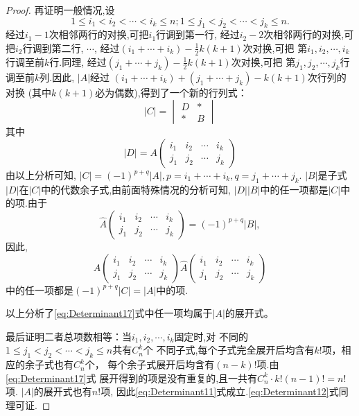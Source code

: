 \begin{proof}
  再证明一般情况,设
  \[ 1 \leq i_1 < i_2 < \cdots < i_k \leq n;1 \leq j_1 < j_2 < \cdots < j_k \leq n.\]
  经过$i_1-1$次相邻两行的对换,可把$i_1$行调到第一行,
  经过$i_2-2$次相邻两行的对换,可把$i_2$行调到第二行, $\cdots$,
  经过$(i_1+\cdots+i_k)-\frac{1}{2}k(k+1)$次对换,可把
  第$i_1,i_2,\cdots,i_k$行调至前$k$行.同理,
  经过$(j_1+\cdots+j_k)-\frac{1}{2}k(k+1)$次对换,可把
  第$j_1,j_2,\cdots,j_k$行调至前$k$列.因此, $|A|$经过
  $(i_1+\cdots+i_k)+(j_1+\cdots+j_k)-k(k+1)$次行列的对换
  (其中$k(k+1)$必为偶数),得到了一个新的行列式：
  \[
    |C|=\begin{vmatrix}
        D & *\\
        * & B%
        \end{vmatrix}
  \]
  其中
  \[
    |D|=A
    \begin{pmatrix}
      i_1 & i_2 & \cdots & i_k\\
      j_1 & j_2 & \cdots & j_k
    \end{pmatrix}
  \]
  由以上分析可知, $|C|=(-1)^{p+q}|A|,p=i_1+\cdots+i_k,q=j_1+\cdots+j_k.$
  $|B|$是子式$|D|$在$|C|$中的代数余子式,由前面特殊情况的分析可知,
  $|D||B|$中的任一项都是$|C|$中的项.由于
  \[\widehat{A}
    \begin{pmatrix}
      i_1 & i_2 & \cdots & i_k\\
      j_1 & j_2 & \cdots & j_k
    \end{pmatrix}
    =(-1)^{p+q}|B|,\]
  因此,
  \begin{equation}\label{eq:Determinant17}
  A
    \begin{pmatrix}
      i_1 & i_2 & \cdots & i_k\\
      j_1 & j_2 & \cdots & j_k
    \end{pmatrix}
    \widehat{A}
    \begin{pmatrix}
      i_1 & i_2 & \cdots & i_k\\
      j_1 & j_2 & \cdots & j_k
    \end{pmatrix}\end{equation}
  中的任一项都是$(-1)^{p+q}|C|=|A|$中的项.

  以上分析了\eqref{eq:Determinant17}式中任一项均属于$|A|$的展开式。

  最后证明二者总项数相等：当$i_1,i_2,\cdots,i_k$固定时,对
  不同的$1 \leq j_1 < j_2 < \cdots < j_k \leq n$共有$C_n^k$个
  不同子式,每个子式完全展开后均含有$k!$项，相应的余子式也有$C_n^k$个，
  每个余子式展开后均含有$(n-k)!$项.由\eqref{eq:Determinant17}式
  展开得到的项是没有重复的,且一共有$C_n^k\cdot k!(n-1)!=n!$项. $|A|$的展开式也有$n!$项,
  因此\eqref{eq:Determinant11}式成立.\eqref{eq:Determinant12}式同理可证.
\end{proof}
